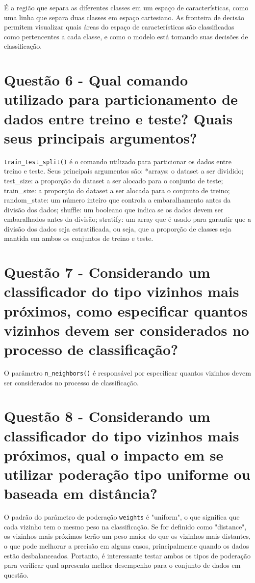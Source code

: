 \documentclass[12pt, a4paper]{article}
\begin{document}
É a região que separa as diferentes classes em um espaço de características, como uma linha que separa duas classes em espaço cartesiano. As fronteira de decisão permitem visualizar quais áreas do espaço de características são classificadas como pertencentes a cada classe, e como o modelo está tomando suas decisões de classificação.

\section*{Questão 6 - Qual comando utilizado para particionamento de dados entre treino e teste? Quais seus
principais argumentos?}

\texttt{train\_test\_split()} é o comando utilizado para particionar os dados entre treino e teste. Seus principais argumentos são: *arrays: o dataset a ser dividido; test\_size: a proporção do dataset a ser alocado para o conjunto de teste; train\_size: a proporção do dataset a ser alocada para o conjunto de treino; random\_state: um número inteiro que controla a embaralhamento antes da divisão dos dados; shuffle: um booleano que indica se os dados devem ser embaralhados antes da divisão; stratify: um array que é usado para garantir que a divisão dos dados seja estratificada, ou seja, que a proporção de classes seja mantida em ambos os conjuntos de treino e teste.

\section*{Questão 7 - Considerando um classificador do tipo vizinhos mais próximos, como especificar quantos
vizinhos devem ser considerados no processo de classificação?}

O parâmetro \texttt{n\_neighbors()} é responsável por especificar quantos vizinhos devem ser considerados no processo de classificação. 

\section*{Questão 8 - Considerando um classificador do tipo vizinhos mais próximos, qual o impacto em se utilizar
poderação tipo uniforme ou baseada em distância?}

O padrão do parâmetro de poderação \texttt{weights} é "uniform", o que significa que cada vizinho tem o mesmo peso na classificação. Se for definido como "distance", os vizinhos mais próximos terão um peso maior do que os vizinhos mais distantes, o que pode melhorar a precisão em alguns casos, principalmente quando os dados estão desbalanceados.
Portanto, é interessante testar ambos os tipos de poderação para verificar qual apresenta melhor desempenho para o conjunto de dados em questão.
\end{document}
